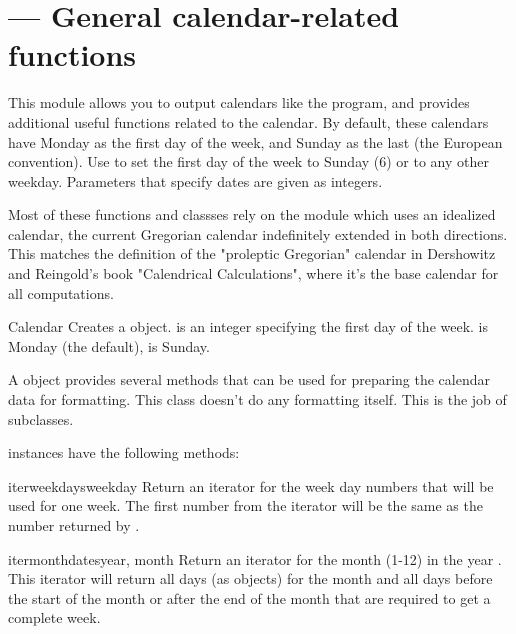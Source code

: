 \section{ ---
         General calendar-related functions}


This module allows you to output calendars like the \UNIX{}
 program, and provides additional useful functions
related to the calendar. By default, these calendars have Monday as
the first day of the week, and Sunday as the last (the European
convention). Use  to set the first day of the
week to Sunday (6) or to any other weekday.  Parameters that specify
dates are given as integers.

Most of these functions and classses rely on the 
module which uses an idealized calendar, the current Gregorian
calendar indefinitely extended in both directions.  This matches
the definition of the "proleptic Gregorian" calendar in Dershowitz
and Reingold's book "Calendrical Calculations", where it's the
base calendar for all computations.

\begin{classdesc}{Calendar}{}
Creates a  object.  is an integer
specifying the first day of the week.  is Monday (the default),
 is Sunday.

A  object provides several methods that can
be used for preparing the calendar data for formatting. This
class doesn't do any formatting itself. This is the job of
subclasses.
\end{classdesc}

 instances have the following methods:

\begin{methoddesc}{iterweekdays}{weekday}
Return an iterator for the week day numbers that will be used
for one week. The first number from the iterator will be the
same as the number returned by .
\end{methoddesc}

\begin{methoddesc}{itermonthdates}{year, month}
Return an iterator for the month  (1-12) in the
year . This iterator will return all days (as
 objects) for the month and all days
before the start of the month or after the end of the month
that are required to get a complete week.
\end{methoddesc}

